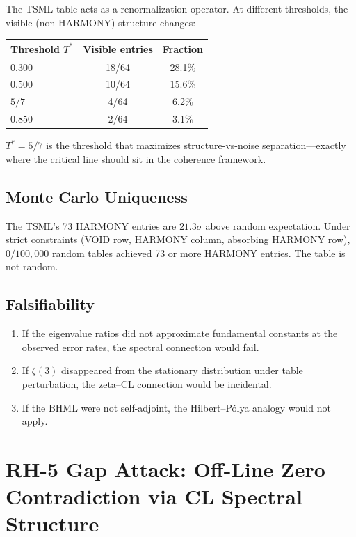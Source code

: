 \documentclass[11pt]{article}
\theoremstyle{remark}
\begin{document}
The TSML table acts as a renormalization operator.  At different thresholds, the visible
(non-HARMONY) structure changes:

\begin{center}
\begin{tabular}{@{}lcc@{}}
\toprule
Threshold $T^*$ & Visible entries & Fraction \\
\midrule
$0.300$ & 18/64 & 28.1\% \\
$0.500$ & 10/64 & 15.6\% \\
$5/7$   &  4/64 &  6.2\% \\
$0.850$ &  2/64 &  3.1\% \\
\bottomrule
\end{tabular}
\end{center}

$T^* = 5/7$ is the threshold that maximizes structure-vs-noise separation---exactly
where the critical line should sit in the coherence framework.

\subsection{Monte Carlo Uniqueness}

The TSML's 73 HARMONY entries are $21.3\sigma$ above random expectation.  Under strict
constraints (VOID row, HARMONY column, absorbing HARMONY row), $0/100{,}000$ random
tables achieved 73 or more HARMONY entries.  The table is not random.

\subsection{Falsifiability}

\begin{enumerate}
  \item If the eigenvalue ratios did not approximate fundamental constants at the
    observed error rates, the spectral connection would fail.
  \item If $\zeta(3)$ disappeared from the stationary distribution under table
    perturbation, the zeta--CL connection would be incidental.
  \item If the BHML were not self-adjoint, the Hilbert--P\'olya analogy would not
    apply.
\end{enumerate}

\section{RH-5 Gap Attack: Off-Line Zero Contradiction via CL Spectral Structure}
\label{sec:rh5-attack}
\end{document}
